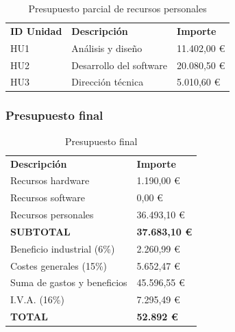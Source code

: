 \begin{table}[H]
 \begin{center}
  \begin{tabular}{lll}
	\textbf{ID Unidad} & \textbf{Descripción} & \textbf{Importe} \\
	HU1 & Análisis y diseño & 11.402,00 \euro \\
	HU2 & Desarrollo del software & 20.080,50 \euro \\
	HU3 & Dirección técnica & 5.010,60 \euro 
  \end{tabular}
  \caption{Presupuesto parcial de recursos personales}
 \end{center}
\end{table}

\subsubsection{Presupuesto final}


\begin{table}[H]
 \begin{center}
  \begin{tabular}{ll}
	\textbf{Descripción} & \textbf{Importe} \\
	Recursos hardware & 1.190,00 \euro \\
	Recursos software & 0,00 \euro \\
	Recursos personales & 36.493,10 \euro \\
	\textbf{SUBTOTAL} & \textbf{37.683,10 \euro} \\
	Beneficio industrial (6\%) & 2.260,99 \euro \\
	Costes generales (15\%) & 5.652,47 \euro \\
	Suma de gastos y beneficios & 45.596,55 \euro \\
	I.V.A. (16\%) & 7.295,49 \euro \\
	\textbf{TOTAL} & \textbf{52.892 \euro}
  \end{tabular}
  \caption{Presupuesto final}
 \end{center}
\end{table}
